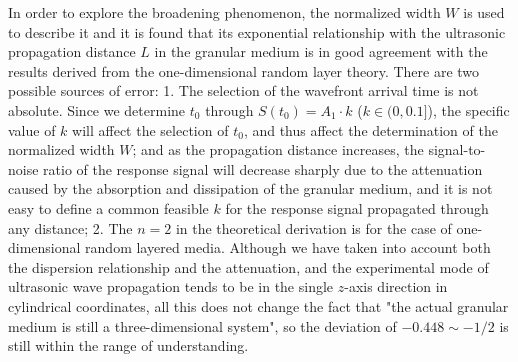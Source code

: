 \begin{digest}
    
    In order to explore the broadening phenomenon, the normalized width $W$ is used to describe it and it is found that its exponential relationship with the ultrasonic propagation distance $L$ in the granular medium is in good agreement with the results derived from the one-dimensional random layer theory. There are two possible sources of error:
    1. The selection of the wavefront arrival time is not absolute. Since we determine $t_{0}$ through $S(t_{0}) = A_{1}\cdot k$ ($k\in(0,0.1]$), the specific value of $k$ will affect the selection of $t_{0}$, and thus affect the determination of the normalized width $W$; and as the propagation distance increases, the signal-to-noise ratio of the response signal will decrease sharply due to the attenuation caused by the absorption and dissipation of the granular medium, and it is not easy to define a common feasible $k$ for the response signal propagated through any distance;
    2. The $n=2$ in the theoretical derivation is for the case of one-dimensional random layered media. Although we have taken into account both the dispersion relationship and the attenuation, and the experimental mode of ultrasonic wave propagation tends to be in the single $z$-axis direction in cylindrical coordinates, all this does not change the fact that "the actual granular medium is still a three-dimensional system", so the deviation of $-0.448\sim-1/2$ is still within the range of understanding.


\end{digest}
